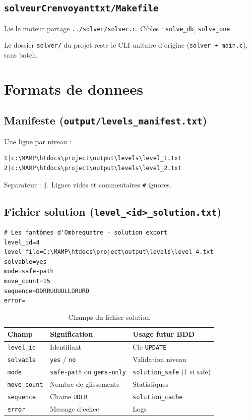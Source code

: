 \documentclass[11pt,a4paper]{article}
\begin{document}
\subsection{\texttt{solveurCrenvoyanttxt/Makefile}}

Lie le moteur partage \texttt{../solver/solver.c}. Cibles : \texttt{solve\_db}, \texttt{solve\_one}.

Le dossier \texttt{solver/} du projet reste le CLI unitaire d'origine (\texttt{solver + main.c}), sans batch.

\section{Formats de donnees}

\subsection{Manifeste (\texttt{output/levels\_manifest.txt})}

Une ligne par niveau :
\begin{lstlisting}[style=kllistingNoFrame]
1|c:\MAMP\htdocs\project\output\levels\level_1.txt
2|c:\MAMP\htdocs\project\output\levels\level_2.txt
\end{lstlisting}

Separateur : \texttt{|}. Lignes vides et commentaires \texttt{\#} ignores.

\subsection{Fichier solution (\texttt{level\_<id>\_solution.txt})}

\begin{lstlisting}[style=kllisting]
# Les fantômes d'Ombrequatre - solution export
level_id=4
level_file=C:\MAMP\htdocs\project\output\levels\level_4.txt
solvable=yes
mode=safe-path
move_count=15
sequence=DDRRUUUULLDRURD
error=
\end{lstlisting}

\begin{table}[h]
\centering
\small
\begin{tabular}{@{}lll@{}}
\toprule
\textbf{Champ} & \textbf{Signification} & \textbf{Usage futur BDD} \\
\midrule
\texttt{level\_id} & Identifiant & Cle \texttt{UPDATE} \\
\texttt{solvable} & \texttt{yes} / \texttt{no} & Validation niveau \\
\texttt{mode} & \texttt{safe-path} ou \texttt{gems-only} & \texttt{solution\_safe} (1 si safe) \\
\texttt{move\_count} & Nombre de glissements & Statistiques \\
\texttt{sequence} & Chaine \texttt{UDLR} & \texttt{solution\_cache} \\
\texttt{error} & Message d'echec & Logs \\
\bottomrule
\end{tabular}
\caption{Champs du fichier solution}
\end{table}
\end{document}
